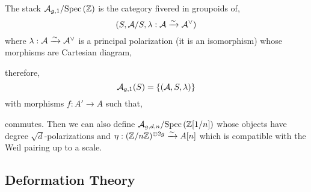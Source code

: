 \documentclass[12pt]{article}
\begin{document}
\begin{defn}
The stack $\mathcal{A}_{g,1} / \mathrm{Spec}\left( \mathbb{Z} \right)$ is the category fivered in groupoids of,
\[ (S, \mathcal{A}/S, \lambda : \mathcal{A} \xrightarrow{\sim} \mathcal{A}^\vee) \]
where $\lambda : \mathcal{A} \xrightarrow{\sim} \mathcal{A}^\vee$ is a principal polarization (it is an isomorphism)
whose morphisms are Cartesian diagram,
\begin{center}
\end{center}
therefore,
\[ \mathcal{A}_{g,1}(S) = \{ (\mathcal{A}, S, \lambda) \} \]
with morphisms $f : A' \to A$ such that,
\begin{center}
\end{center}
commutes. Then we can also define $\mathcal{A}_{g,d,n} / \mathrm{Spec}\left( \mathbb{Z}[1/n] \right)$ whose objects have degree $\sqrt{d}$-polarizations and $\eta : (\mathbb{Z} / n \mathbb{Z})^{\oplus 2g} \xrightarrow{\sim} A[n]$ which is compatible with the Weil pairing up to a scale. 
\end{defn}

\subsection{Deformation Theory}

\newcommand{\Def}{\mathrm{Def}}
\end{document}
